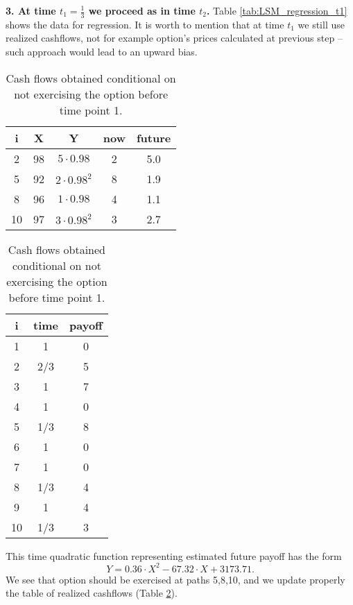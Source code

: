 \documentclass[a4paper,11pt, twoside]{book}
\theoremstyle{definition}
\theoremstyle{remark}
\begin{document}
\noindent \textbf{3. At time $t_1 = \frac{1}{3}$ we proceed as in time $t_2$.}
Table \ref{tab:LSM_regression_t1} shows the data for regression. It is worth to mention that at time $t_1$ we still use realized cashflows, not for example option's prices calculated at previous step -- such approach would lead to an upward bias.
\begin{table}[!ht]
\parbox{.45\linewidth} {
  \centering
  \caption{Estimating future payoffs at time point 1.}
  \label{tab:LSM_regression_t1}
  \begin{tabular} {||c |c |c || c | c ||}  
  \hline 
    i & X   &  Y  & now   &  future\\ \hline \hline
    2 & 98 & $5\cdot 0.98$ & 2 & 5.0 \\ \hline
    5 & 92 & $2\cdot 0.98^2$ & 8 & 1.9  \\ \hline
    8 & 96 & $1\cdot 0.98$ & 4 & 1.1 \\ \hline
  10 & 97 & $3\cdot 0.98^2$ & 3 & 2.7 \\ \hline
  \end{tabular}
}
\qquad
\parbox{.45\linewidth} {
  \centering
  \caption{Cash flows obtained conditional on not exercising the option before time point 1.}
  \label{tab:LSM_cashflows_t1}
  \begin{tabular}{|| c | c | c ||}
  \hline 
  i  & time  &  payoff \\ \hline \hline
  1  & 1     &      0 \\ \hline
  2  & 2/3   &      5 \\ \hline
  3  & 1     &      7 \\ \hline
  4  & 1     &      0 \\ \hline
  5  & 1/3   &      8 \\ \hline
  6  & 1     &      0 \\ \hline
  7  & 1     &      0 \\ \hline
  8  & 1/3   &      4 \\ \hline
  9  & 1     &      4 \\ \hline
  10  & 1/3   &      3 \\ \hline
  \end{tabular}
}
\end{table}

This time quadratic function representing estimated future payoff has the form
\[ Y = 0.36\cdot X^2 - 67.32\cdot X + 3173.71. \]
We see that option should be exercised at paths 5,8,10, and we update properly the table of realized cashflows (Table \ref{tab:LSM_cashflows_t1}).
\end{document}
